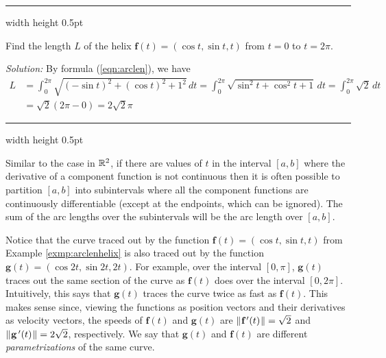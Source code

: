 \vspace{2mm}
\hrule width \textwidth height 0.5pt
\begin{exmp}\label{exmp:arclenhelix}
 Find the length $L$ of the helix $\textbf{f}(t) = ( \cos t , \sin t , t )$ from $t = 0$ to $t =
 2\pi$.\vspace{1mm}
 \par\noindent \emph{Solution:} By formula (\ref{eqn:arclen}), we have
 \begin{align*}
  L &= \int_{0}^{2\pi} \sqrt{(-\sin t)^2 + (\cos t)^2 + 1^2}\,dt = \int_{0}^{2\pi} \sqrt{\sin^2 t + \cos^2 t + 1}\,dt =
  \int_{0}^{2\pi} \sqrt{2}\,dt\\
  &= \sqrt{2} (2\pi - 0) = 2\sqrt{2}\pi
 \end{align*}
\end{exmp}
\hrule width \textwidth height 0.5pt
\vspace{2mm}

Similar to the case in $\mathbb{R}^{2}$, if there are values of $t$ in the interval $[a,b]$ where the derivative of a
component function is not continuous then it is often possible to partition $[a,b]$ into subintervals where all the
component functions are continuously differentiable (except at the endpoints, which can be ignored).
The sum of the arc lengths over the subintervals will be the arc length over $[a,b]$.

Notice that the curve traced out by the function $\textbf{f}(t) = (\cos t , \sin t , t)$ from Example
\ref{exmp:arclenhelix} is also traced out by the function $\textbf{g}(t) = (\cos 2t , \sin 2t , 2t)$.
For example, over the interval $[0,\pi]$, $\textbf{g}(t)$ traces out the same section of the curve as $\textbf{f}(t)$
does over the interval $[0,2\pi]$. Intuitively, this says that $\textbf{g}(t)$ traces the curve twice as fast as
$\textbf{f}(t)$. This makes sense since, viewing the functions as position vectors and their derivatives as velocity
vectors, the speeds of $\textbf{f}(t)$ and $\textbf{g}(t)$ are $\lVert\mspace{1mu}\textbf{f}\,'(t)\mspace{1mu}\rVert = \sqrt{2}$ and
$\lVert\mspace{1mu}\textbf{g}\,'(t)\mspace{1mu}\rVert = 2\sqrt{2}$, respectively. We say that $\textbf{g}(t)$ and $\textbf{f}(t)$ are different
\emph{parametrizations} of the same curve.


